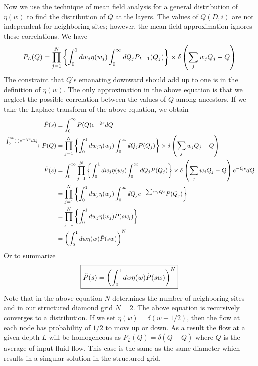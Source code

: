 Now we use the technique of mean field analysis for a general
distribution of $\eta(w)$ to find the distribution of $Q$ at the
layers. The values of $Q(D,i)$ are not independent for neighboring
sites; however, the mean field approximation ignores these
correlations. We have
%
\begin{align}
  P_L (Q) = \prod_{j=1}^N \left\{ \int_0^1 d w_j \eta(w_j) \int_0^{\infty} dQ_j P_{L-1}(Q_j)\right\} \times \delta \left( \sum_j w_j Q_{j} - Q \right)
\end{align}
%
The constraint that $Q$'s emanating downward should add up to one is
in the definition of $\eta(w)$. The only approximation in the above
equation is that we neglect the possible correlation between the
values of $Q$ among ancestors. If we take the Laplace transform of
the above equation, we obtain
%
\begin{align}
  \tilde P(s) & \equiv \int_0^{\infty} P(Q) e^{-Qs} dQ\\
  \xrightarrow{\int_0^{\infty} (\cdot) e^{-Qs} dQ}  P (Q) & = \prod_{j=1}^N \left\{ \int_0^1 d w_j \eta(w_j) \int_0^{\infty} dQ_j P(Q_j)\right\} \times \delta \left( \sum_j w_j Q_{j} - Q \right) \\
  \tilde P(s) & = \int_0^{\infty} \prod_{j=1}^N \left\{ \int_0^1 d w_j \eta(w_j) \int_0^{\infty} dQ_j P(Q_j)\right\} \times \delta \left( \sum_j w_j Q_{j} - Q \right) e^{-Qs}dQ \\
              & = \prod_{j=1}^N \left\{ \int_0^1 d w_j \eta(w_j) \int_0^{\infty} dQ_j e^{-\sum w_{j}Q_{j}} P(Q_j)\right\}   \\
              & = \prod_{j=1}^N \left\{ \int_0^1 d w_j \eta(w_j) \tilde P(s w_j) \right\} \\
  & = \left(  \int_0^1 d w \eta(w) \tilde P(s w)  \right)^{N}
\end{align}
%
Or to summarize
%
\begin{align}
  \boxed{\tilde P(s) = \left(  \int_0^1 d w \eta(w) \tilde P(s w)  \right)^{N}} \label{eq:main-laplace}
\end{align}
%
Note that in the above equation $N$ determines the number of
neighboring sites and in our structured diamond grid $N=2$. The above
equation is recursively converges to a distribution.  If we set
$\eta(w) = \delta(w-1/2)$, then the flow at each node has probability of
$1/2$ to move up or down. As a result the flow at a given depth $L$
will be homogeneous as $P_L(Q) = \delta (Q-\bar{Q})$ where $\bar{Q}$
is the average of input fluid flow. This case is the same as the same
diameter which results in a singular solution in the structured grid.

